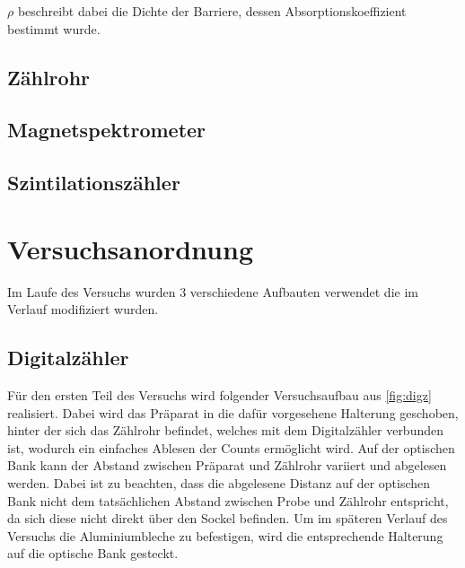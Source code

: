 \documentclass[12pt,english,ngerman]{scrartcl}
\begin{document}
$\rho$ beschreibt dabei die Dichte der Barriere, dessen Absorptionskoeffizient bestimmt wurde.





\subsection{Zählrohr}


\subsection{Magnetspektrometer}


\subsection{Szintilationszähler}




\section{Versuchsanordnung}\label{sec:Versuchsanordnung}

Im Laufe des Versuchs wurden 3 verschiedene Aufbauten verwendet die im Verlauf modifiziert wurden.

\subsection{Digitalzähler}\label{aufbau_Digz}

Für den ersten Teil des Versuchs wird folgender Versuchsaufbau aus
\autoref{fig:digz} realisiert. Dabei wird das Präparat in die dafür vorgesehene
Halterung geschoben, hinter der sich das Zählrohr befindet, welches mit dem
Digitalzähler verbunden ist, wodurch ein einfaches Ablesen der Counts
ermöglicht wird. Auf der optischen Bank kann der Abstand zwischen Präparat und
Zählrohr variiert und abgelesen werden. Dabei ist zu beachten, dass die
abgelesene Distanz auf der optischen Bank nicht dem tatsächlichen Abstand
zwischen Probe und Zählrohr entspricht, da sich diese nicht direkt über den
Sockel befinden. Um im späteren Verlauf des Versuchs die Aluminiumbleche zu
befestigen, wird die entsprechende Halterung auf die optische Bank gesteckt.
\end{document}
